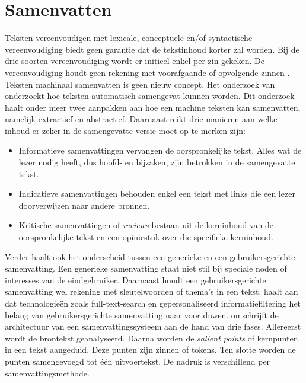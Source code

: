 \section{Samenvatten}

Teksten vereenvoudigen met lexicale, conceptuele en/of syntactische vereenvoudiging biedt geen garantie dat de tekstinhoud korter zal worden. Bij de drie soorten vereenvoudiging wordt er initieel enkel per zin gekeken. De vereenvoudiging houdt geen rekening met voorafgaande of opvolgende zinnen \autocite{Dubay2004}. Teksten machinaal samenvatten is geen nieuw concept. Het onderzoek van \textcite{Hahn2000} onderzoekt hoe teksten automatisch samengevat kunnen worden. Dit onderzoek haalt onder meer twee aanpakken aan hoe een machine teksten kan samenvatten, namelijk extractief en abstractief. Daarnaast reikt \textcite{Hahn2000} drie manieren aan welke inhoud er zeker in de samengevatte versie moet op te merken zijn:

\begin{itemize}
	\item Informatieve samenvattingen vervangen de oorspronkelijke tekst. Alles wat de lezer nodig heeft, dus hoofd- en bijzaken, zijn betrokken in de samengevatte tekst.
	\item Indicatieve samenvattingen behouden enkel een tekst met links die een lezer doorverwijzen naar andere bronnen. 
	\item Kritische samenvattingen of \textit{reviews} bestaan uit de kerninhoud van de oorspronkelijke tekst en een opiniestuk over die specifieke kerninhoud.
\end{itemize}

Verder haalt \textcite{Hahn2000} ook het onderscheid tussen een generieke en een gebruikersgerichte samenvatting. Een generieke samenvatting staat niet stil bij speciale noden of interesses van de eindgebruiker. Daarnaast houdt een gebruikersgerichte samenvatting wel rekening met sleutelwoorden of thema's in een tekst. \textcite{Hahn2000} haalt aan dat technologieën zoals full-text-search en gepersonaliseerd informatiefiltering het belang van gebruikersgerichte samenvatting naar voor duwen. \textcite{Hahn2000} omschrijft de architectuur van een samenvattingssysteem aan de hand van drie fases. Allereerst wordt de brontekst geanalyseerd. Daarna worden de \textit{salient points} of kernpunten in een tekst aangeduid. Deze punten zijn zinnen of tokens. Ten slotte worden de punten samengevoegd tot één uitvoertekst. De nadruk is verschillend per samenvattingsmethode.

